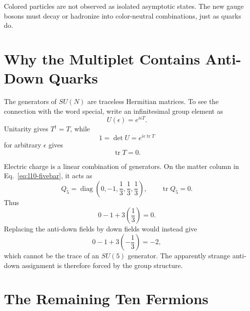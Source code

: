 \begin{classroomqa}
\end{classroomqa}

Colored particles are not observed as isolated asymptotic states. The new gauge bosons must decay or hadronize into color-neutral combinations, just as quarks do.

\section{Why the Multiplet Contains Anti-Down Quarks}

The generators of \(SU(N)\) are traceless Hermitian matrices. To see the connection with the word special, write an infinitesimal group element as
\begin{equation}
U(\epsilon)=e^{i\epsilon T}.
\end{equation}
Unitarity gives \(T^\dagger=T\), while
\begin{equation}
1=\det U=e^{i\epsilon\operatorname{tr}T}
\end{equation}
for arbitrary \(\epsilon\) gives
\begin{equation}
\operatorname{tr}T=0.
\label{eq:l10-traceless-generator}
\end{equation}

Electric charge is a linear combination of generators. On the matter column in Eq.~\eqref{eq:l10-fivebar}, it acts as
\begin{equation}
Q_{\overline5}
=
\operatorname{diag}
\left(0,-1,\frac13,\frac13,\frac13\right),
\qquad
\operatorname{tr}Q_{\overline5}=0.
\label{eq:l10-charge-fivebar}
\end{equation}
Thus
\begin{equation}
0-1+3\left(\frac13\right)=0.
\end{equation}
Replacing the anti-down fields by down fields would instead give
\begin{equation}
0-1+3\left(-\frac13\right)=-2,
\end{equation}
which cannot be the trace of an \(SU(5)\) generator. The apparently strange anti-down assignment is therefore forced by the group structure.

\section{The Remaining Ten Fermions}

